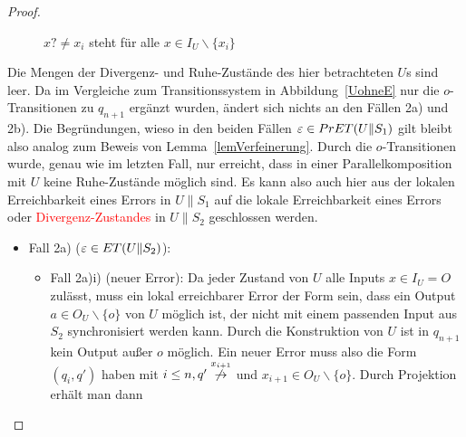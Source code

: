 \begin{proof}
\begin{itemize}
\begin{figure} [h!tbp]
\begin{center}
        \caption{$x?\neq x_i$ steht für alle $x\in I_U\backslash\{x_i\}$}
\label{UohneEmitO}
      \end{center}
      \end{figure}
      Die Mengen der Divergenz- und Ruhe-Zustände des hier betrachteten $U$s
      sind leer. Da im Vergleiche zum Transitionssystem in
      Abbildung~\ref{UohneE} nur die $o$-Transitionen zu $q_{n+1}$ ergänzt
      wurden, ändert sich nichts an den Fällen 2a) und 2b). Die Begründungen,
      wieso in den beiden Fällen $\varepsilon\in PrET{}(U\|S_1)$ gilt bleibt
      also analog zum Beweis von Lemma~\ref{lemVerfeinerung}. Durch die
      $o$-Transitionen wurde, genau wie im letzten Fall, nur erreicht, dass in
      einer Parallelkomposition mit $U$ keine Ruhe-Zustände möglich sind. Es
      kann also auch hier aus der lokalen Erreichbarkeit eines Errors
      in $U\|S_1$ auf die lokale Erreichbarkeit eines Errors oder
      \textcolor{red}{Divergenz-Zustandes} in $U\|S_2$ geschlossen werden.
      \begin{itemize}
        \item Fall 2a) ($\varepsilon\in ET{}(U\|S_2)$):
          \begin{itemize}
            \item Fall 2a)i) (neuer Error): Da jeder Zustand von $U$ alle
              Inputs $x\in I_U=O$ zulässt, muss ein lokal erreichbarer Error der
              Form sein, dass ein Output $a\in O_U\backslash\{o\}$ von $U$
              möglich ist, der nicht mit einem passenden Input aus $S_2$
              synchronisiert werden kann. Durch die Konstruktion von $U$ ist in
              $q_{n+1}$ kein Output außer $o$ möglich. Ein neuer Error muss
              also die Form $(q_i,q')$ haben mit $i\leq n, q'
              \overset{x_{i+1}}{\not{\hspace{-0.1cm}\rightarrow}}$ und
              $x_{i+1}\in O_U\backslash\{o\}$. Durch Projektion erhält man dann

\end{itemize}
\end{itemize}
\end{itemize}
\end{proof}
